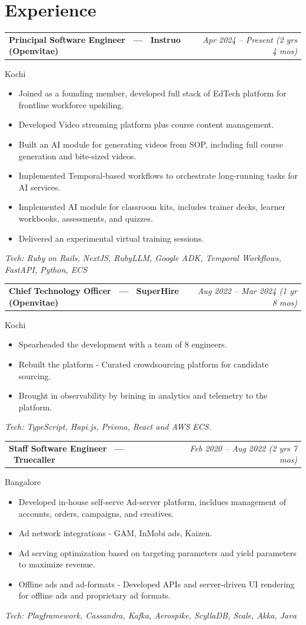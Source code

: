 \documentclass[10.5pt,a4paper]{article}
\makeatletter
\newcommand{\jobheader}[3]{%
  \noindent
  \begin{tabular*}{\textwidth}{@{\extracolsep{\fill}}l r}
    \textbf{\large #1} & {\itshape\color{lightgray} #3} \\
  \end{tabular*}\par
}
\newcommand{\jobentry}[4]{%
  \jobheader{#1 \ --- \ \textbf{#2}}{}{#3}
  {\color{graytext} #4}\par\vspace{2pt}
}
\newcommand{\techline}[1]{%
  {\small\itshape\color{blue} Tech: #1}\par\vspace{6pt}
}
\makeatother
\begin{document}
\section{Experience}

\jobentry{Principal Software Engineer}{Instruo (Openvitae)}{Apr 2024 -- Present (2 yrs 4 mos)}{Kochi}
\begin{itemize}[leftmargin=16pt, itemsep=1pt, topsep=2pt, parsep=0pt]
  \item Joined as a founding member, developed full stack of EdTech platform for frontline workforce upskiling.
  \item Developed Video streaming platform plus course content management.
  \item Built an AI module for generating videos from SOP, including full course generation and bite-sized videos.
  \item Implemented Temporal-based workflows to orchestrate long-running tasks for AI services.
  \item Implemented AI module for classroom kits, includes trainer decks, learner workbooks, assessments, and quizzes.
  \item Delivered an experimental virtual training sessions.
\end{itemize}
\techline{Ruby on Rails, NextJS, RubyLLM, Google ADK, Temporal Workflows, FastAPI, Python, ECS}

\jobentry{Chief Technology Officer}{SuperHire (Openvitae)}{Aug 2022 -- Mar 2024 (1 yr 8 mos)}{Kochi}
\begin{itemize}[leftmargin=16pt, itemsep=1pt, topsep=2pt, parsep=0pt]
  \item Spearheaded the development with a team of 8 engineers.
  \item Rebuilt the platform - Curated crowdsourcing platform for candidate sourcing.
  \item Brought in observability by brining in analytics and telemetry to the platform.
\end{itemize}
\techline{TypeScript, Hapi.js, Prisma, React and AWS ECS.}

\jobentry{Staff Software Engineer}{Truecaller}{Feb 2020 -- Aug 2022 (2 yrs 7 mos)}{Bangalore}
\begin{itemize}[leftmargin=16pt, itemsep=1pt, topsep=2pt, parsep=0pt]
  \item Developed in-house self-serve Ad-server platform, incldues management of accounts, orders, campaigns, and creatives.
  \item Ad network integrations - GAM, InMobi ads, Kaizen.
  \item Ad serving optimization based on targeting parameters and yield parameters to maximize revenue.
  \item Offline ads and ad-formats - Developed APIs and server-driven UI rendering for offline ads and proprietary ad formats.
\end{itemize}
\techline{Playframework, Cassandra, Kafka, Aerospike, ScyllaDB, Scale, Akka, Java}
\end{document}
